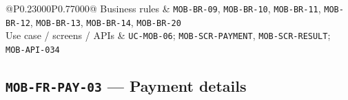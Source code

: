 \begin{longtable}{@{}P{0.23000\SRSWidth}P{0.77000\SRSWidth}@{}}
Business rules & \texttt{MOB-\allowbreak{}BR-\allowbreak{}09}, \texttt{MOB-\allowbreak{}BR-\allowbreak{}10}, \texttt{MOB-\allowbreak{}BR-\allowbreak{}11}, \texttt{MOB-\allowbreak{}BR-\allowbreak{}12}, \texttt{MOB-\allowbreak{}BR-\allowbreak{}13}, \texttt{MOB-\allowbreak{}BR-\allowbreak{}14}, \texttt{MOB-\allowbreak{}BR-\allowbreak{}20} \\[3pt]
Use case /\allowbreak{} screens /\allowbreak{} APIs & \texttt{UC-\allowbreak{}MOB-\allowbreak{}06}; \texttt{MOB-\allowbreak{}SCR-\allowbreak{}PAYMENT}, \texttt{MOB-\allowbreak{}SCR-\allowbreak{}RESULT}; \texttt{MOB-\allowbreak{}API-\allowbreak{}034} \\[3pt]
\end{longtable}
\endgroup

\subsection{\texttt{MOB-\allowbreak{}FR-\allowbreak{}PAY-\allowbreak{}03} — Payment details}
\begingroup
\fontsize{9.5}{12}\selectfont
\setlength{\SRSWidth}{\dimexpr\linewidth-2\tabcolsep\relax}
